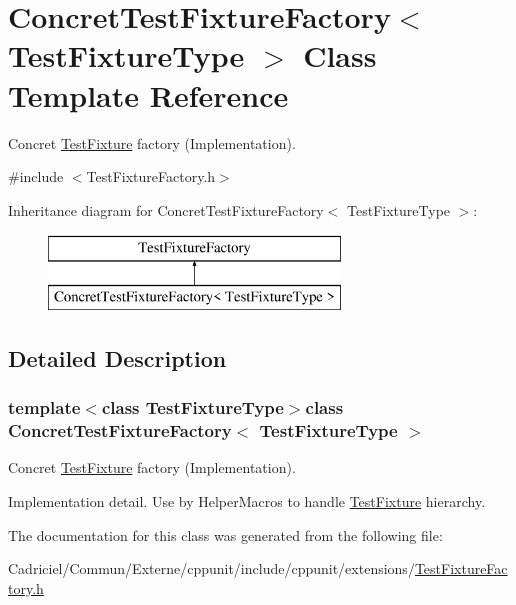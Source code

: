 \hypertarget{class_concret_test_fixture_factory}{\section{Concret\-Test\-Fixture\-Factory$<$ Test\-Fixture\-Type $>$ Class Template Reference}
\label{class_concret_test_fixture_factory}
}


Concret \hyperlink{class_test_fixture}{Test\-Fixture} factory (Implementation).  




{\ttfamily \#include $<$Test\-Fixture\-Factory.\-h$>$}

Inheritance diagram for Concret\-Test\-Fixture\-Factory$<$ Test\-Fixture\-Type $>$\-:\begin{figure}[H]
\begin{center}
\leavevmode
\includegraphics[height=2.000000cm]{class_concret_test_fixture_factory}
\end{center}
\end{figure}


\subsection{Detailed Description}
\subsubsection*{template$<$class Test\-Fixture\-Type$>$class Concret\-Test\-Fixture\-Factory$<$ Test\-Fixture\-Type $>$}

Concret \hyperlink{class_test_fixture}{Test\-Fixture} factory (Implementation). 

Implementation detail. Use by Helper\-Macros to handle \hyperlink{class_test_fixture}{Test\-Fixture} hierarchy. 

The documentation for this class was generated from the following file\-:\begin{DoxyCompactItemize}
\item 
Cadriciel/\-Commun/\-Externe/cppunit/include/cppunit/extensions/\hyperlink{_test_fixture_factory_8h}{Test\-Fixture\-Factory.\-h}\end{DoxyCompactItemize}
